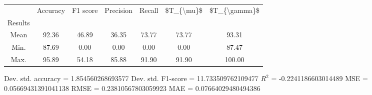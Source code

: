 \begin{tabular}{|c|c|c|c|c|c|c|}
\toprule
{} &  Accuracy &  F1 score &  Precision &  Recall &  \$T\_\{\textbackslash mu\}\$ &  \$T\_\{\textbackslash gamma\}\$ \\
Results &           &           &            &         &            &               \\
\hline
Mean    &     92.36 &     46.89 &      36.35 &   73.77 &      73.77 &         93.31 \\
Min.    &     87.69 &      0.00 &       0.00 &    0.00 &       0.00 &         87.47 \\
Max.    &     95.89 &     54.18 &      85.88 &   91.90 &      91.90 &        100.00 \\
\bottomrule
\end{tabular}

 Dev. std. accuracy = 1.854560268693577
 Dev. std. F1-score = 11.733509762109477
 $R^2$ = -0.2241186603014489
 MSE = 0.05669431391041138
 RMSE = 0.23810567803059923
 MAE = 0.07664029480494386